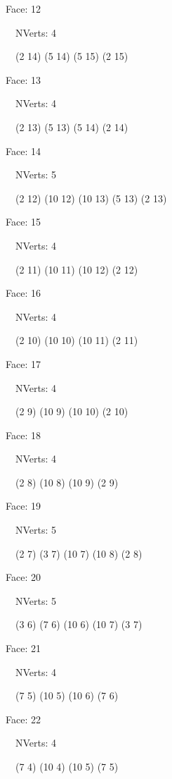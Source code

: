 \documentclass{article}
\begin{document}
{\footnotesize 

Face: 12

\   \    NVerts: 4

 \   \   (2 14) (5 14) (5 15) (2 15)}

{\footnotesize 

Face: 13

\   \    NVerts: 4

 \   \   (2 13) (5 13) (5 14) (2 14)}

{\footnotesize 

Face: 14

\   \    NVerts: 5

 \   \   (2 12) (10 12) (10 13) (5 13) (2 13)}

{\footnotesize 

Face: 15

\   \    NVerts: 4

 \   \   (2 11) (10 11) (10 12) (2 12)}

{\footnotesize 

Face: 16

\   \    NVerts: 4

 \   \   (2 10) (10 10) (10 11) (2 11)}

{\footnotesize 

Face: 17

\   \    NVerts: 4

 \   \   (2 9) (10 9) (10 10) (2 10)}

{\footnotesize 

Face: 18

\   \    NVerts: 4

 \   \   (2 8) (10 8) (10 9) (2 9)}

{\footnotesize 

Face: 19

\   \    NVerts: 5

 \   \   (2 7) (3 7) (10 7) (10 8) (2 8)}

{\footnotesize 

Face: 20

\   \    NVerts: 5

 \   \   (3 6) (7 6) (10 6) (10 7) (3 7)}

{\footnotesize 

Face: 21

\   \    NVerts: 4

 \   \   (7 5) (10 5) (10 6) (7 6)}

{\footnotesize 

Face: 22

\   \    NVerts: 4

 \   \   (7 4) (10 4) (10 5) (7 5)}
\end{document}
